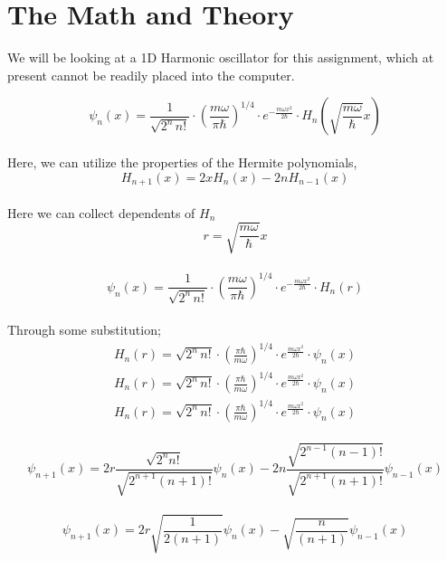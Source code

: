 \documentclass[12pt,letterpaper,notitlepage]{article}
\newcommand{\BM}{\begin{subequations}}
\newcommand{\EM}{\end{subequations}}
\begin{document}
\section{The Math and Theory}

We will be looking at a 1D Harmonic oscillator for this assignment, which at present cannot be readily placed into the computer. 

	\begin{equation}
		\psi_n(x) = \frac{1}{\sqrt{2^n\,n!}} \cdot \left(\frac{m\omega}{\pi \hbar}\right)^{1/4}\cdot e^{
		- \frac{m\omega x^2}{2 \hbar}} \cdot H_n\left(\sqrt{\frac{m\omega}{\hbar}} x \right)
	\end{equation}
\\
Here, we can utilize the properties of the Hermite polynomials, 
\\
\begin{equation}
	H_{n+1}(x)=2xH_n(x)-2nH_{n-1}(x)
\end{equation}	
\\
Here we can collect dependents of $H_n$ 
\\
	\begin{equation}
		r = \sqrt{\frac{m\omega}{\hbar}} x
	\end{equation}
\\
	\begin{equation}
		\psi_n(x) = \frac{1}{\sqrt{2^n\,n!}} \cdot \left(\frac{m\omega}{\pi \hbar}\right)^{1/4}\cdot e^{
	-	 \frac{m\omega x^2}{2 \hbar}} \cdot H_n(r)
	\end{equation}
\\
Through some substitution;
\\
\BM
	\begin{align}
		H_n(r)={\sqrt{2^n\,n!}} \cdot \left(\frac{\pi \hbar}{m\omega}\right)^{1/4}\cdot e^{ \frac{m\omega x^2}{2 \hbar}} \cdot \psi_n(x)\\
		H_n(r)={\sqrt{2^n\,n!}} \cdot \left(\frac{\pi \hbar}{m\omega}\right)^{1/4}\cdot e^{ \frac{m\omega x^2}{2 \hbar}} \cdot \psi_n(x)\\
		H_n(r)={\sqrt{2^n\,n!}} \cdot \left(\frac{\pi \hbar}{m\omega}\right)^{1/4}\cdot e^{ \frac{m\omega x^2}{2 \hbar}} \cdot \psi_n(x)
	\end{align}
\EM 
\\
	\begin{equation}
		\psi_{n+1}(x)=2r\frac{\sqrt{2^{n} n!}}{\sqrt{2^{n+1}(n+1)!}}\psi_n (x) - 2n\frac{\sqrt{2^{n-1} (n-1)!}}{\sqrt{2^{n+1}(n+1)!}}\psi_{n-1}(x) 
	\end{equation}
\\
	\begin{equation}
		\psi_{n+1}(x)=2r{\sqrt{\frac{1}{2(n+1)}}}\psi_n (x) - {\sqrt{\frac{n}{(n+1)}}}\psi_{n-1} (x) 
	\end{equation}
\\
\\
\end{document}
